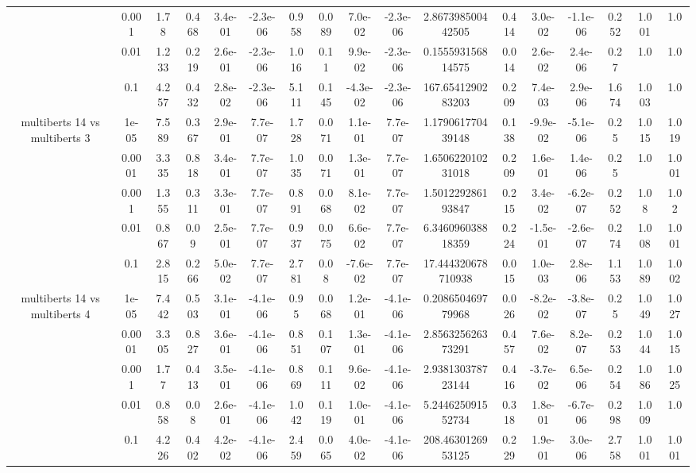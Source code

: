 \begin{tabular}{|c|c|c|c|c|c|c|c|c|c|c|c|c|c|c|c|c|}
 & 0.001 & 1.78 & 0.468 & 3.4e-01 & -2.3e-06 & 0.958 & 0.089 & 7.0e-02 & -2.3e-06 & 2.867398500442505 & 0.414 & 3.0e-02 & -1.1e-06 & 0.252 & 1.001 & 1.0 \\
 & 0.01 & 1.233 & 0.219 & 2.6e-01 & -2.3e-06 & 1.016 & 0.11 & 9.9e-02 & -2.3e-06 & 0.155593156814575 & 0.014 & 2.6e-02 & 2.4e-06 & 0.27 & 1.0 & 1.0 \\
 & 0.1 & 4.257 & 0.432 & 2.8e-02 & -2.3e-06 & 5.111 & 0.145 & -4.3e-02 & -2.3e-06 & 167.6541290283203 & 0.209 & 7.4e-03 & 2.9e-06 & 1.674 & 1.003 & 1.0 \\
\hline
\multirow{5}{*}{multiberts 14 vs multiberts 3} & 1e-05 & 7.589 & 0.367 & 2.9e-01 & 7.7e-07 & 1.728 & 0.071 & 1.1e-01 & 7.7e-07 & 1.179061770439148 & 0.138 & -9.9e-02 & -5.1e-06 & 0.25 & 1.015 & 1.019 \\
 & 0.0001 & 3.335 & 0.818 & 3.4e-01 & 7.7e-07 & 1.035 & 0.071 & 1.3e-01 & 7.7e-07 & 1.650622010231018 & 0.209 & 1.6e-01 & 1.4e-06 & 0.25 & 1.0 & 1.001 \\
 & 0.001 & 1.355 & 0.311 & 3.3e-01 & 7.7e-07 & 0.891 & 0.068 & 8.1e-02 & 7.7e-07 & 1.501229286193847 & 0.215 & 3.4e-02 & -6.2e-07 & 0.252 & 1.08 & 1.02 \\
 & 0.01 & 0.867 & 0.09 & 2.5e-01 & 7.7e-07 & 0.937 & 0.075 & 6.6e-02 & 7.7e-07 & 6.346096038818359 & 0.224 & -1.5e-01 & -2.6e-07 & 0.274 & 1.008 & 1.001 \\
 & 0.1 & 2.815 & 0.266 & 5.0e-02 & 7.7e-07 & 2.781 & 0.08 & -7.6e-02 & 7.7e-07 & 17.444320678710938 & 0.015 & 1.0e-03 & 2.8e-06 & 1.153 & 1.089 & 1.002 \\
\hline
\multirow{5}{*}{multiberts 14 vs multiberts 4} & 1e-05 & 7.442 & 0.503 & 3.1e-01 & -4.1e-06 & 0.95 & 0.068 & 1.2e-01 & -4.1e-06 & 0.208650469779968 & 0.026 & -8.2e-02 & -3.8e-07 & 0.25 & 1.049 & 1.027 \\
 & 0.0001 & 3.305 & 0.827 & 3.6e-01 & -4.1e-06 & 0.851 & 0.107 & 1.3e-01 & -4.1e-06 & 2.856325626373291 & 0.457 & 7.6e-02 & 8.2e-07 & 0.253 & 1.044 & 1.015 \\
 & 0.001 & 1.77 & 0.413 & 3.5e-01 & -4.1e-06 & 0.869 & 0.111 & 9.6e-02 & -4.1e-06 & 2.938130378723144 & 0.416 & -3.7e-02 & 6.5e-06 & 0.254 & 1.086 & 1.025 \\
 & 0.01 & 0.858 & 0.08 & 2.6e-01 & -4.1e-06 & 1.042 & 0.119 & 1.0e-01 & -4.1e-06 & 5.244625091552734 & 0.318 & 1.8e-01 & -6.7e-06 & 0.298 & 1.009 & 1.0 \\
 & 0.1 & 4.226 & 0.402 & 4.2e-02 & -4.1e-06 & 2.459 & 0.065 & 4.0e-02 & -4.1e-06 & 208.4630126953125 & 0.229 & 1.9e-01 & 3.0e-06 & 2.758 & 1.001 & 1.001 \\

\end{tabular}
